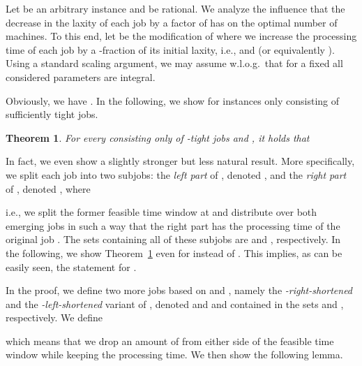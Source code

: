 \documentclass[letterpaper,11pt]{article}
\newtheorem{theorem}{Theorem}
\begin{document}
Let  be an arbitrary instance and  be rational. We analyze the influence that  the decrease in the laxity of each job by a factor of  has on the optimal number of machines. To this end, let  be the modification of  where we increase the processing time of each job by a -fraction of its initial laxity, i.e.,  and  (or equivalently ). Using a standard scaling argument, we may assume w.l.o.g.~that for a fixed  all considered parameters are integral.

Obviously, we have . In the following, we show  for instances  only consisting of sufficiently tight jobs.

\begin{theorem}\label{thm:laxity-drop} For every  consisting only of -tight jobs and , it holds that

\end{theorem}

In fact, we even show a slightly stronger but less natural result. More specifically, we split each job  into two subjobs: the \textit{left part} of , denoted , and the \textit{right part} of , denoted , where 

i.e., we split the former feasible time window at  and distribute  over both emerging jobs in such a way that the right part has the processing time of the original job . The sets containing all of these subjobs are  and , respectively. In the following, we show Theorem~\ref{thm:laxity-drop} even for  instead of . This implies, as can be easily seen, the statement for .

In the proof, we define two more jobs based on  and , namely the {\em -right-shortened} and the {\em -left-shortened} variant of , denoted  and  and contained in the sets  and , respectively. We define

which means that we drop an amount of  from either side of the feasible time window while keeping the processing time. We then show the following lemma.
\end{document}
